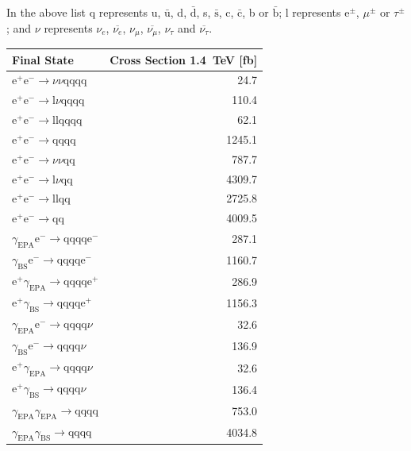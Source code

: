 \noindent In the above list q represents u, $\bar{\text{u}}$, d, $\bar{\text{d}}$, s, $\bar{\text{s}}$, c, $\bar{\text{c}}$, b or $\bar{\text{b}}$;  l represents $\text{e}^{\pm}$, $\mu^{\pm}$ or $\tau^{\pm}$; and $\nu$ represents $\nu_{e}$, $\overline{\nu_{e}}$, $\nu_{\mu}$, $\overline{\nu_{\mu}}$, $\nu_{\tau}$ and $\overline{\nu_{\tau}}$.

\begin{table}[h!]
\centering
\begin{tabular}{ l r }
\hline
Final State & Cross Section 1.4~TeV [fb] \\ 
\hline
$\text{e}^{+}\text{e}^{-} \rightarrow \nu{\nu}\text{qqqq}$ & 24.7 \\
$\text{e}^{+}\text{e}^{-} \rightarrow \text{l}\nu\text{qqqq}$ & 110.4\\
$\text{e}^{+}\text{e}^{-} \rightarrow \text{llqqqq}$ & 62.1\\
$\text{e}^{+}\text{e}^{-} \rightarrow \text{qqqq}$ & 1245.1\\
$\text{e}^{+}\text{e}^{-} \rightarrow \nu{\nu}\text{qq}$ & 787.7\\
$\text{e}^{+}\text{e}^{-} \rightarrow \text{l}\nu\text{qq}$ & 4309.7\\
$\text{e}^{+}\text{e}^{-} \rightarrow \text{llqq}$ & 2725.8\\
$\text{e}^{+}\text{e}^{-} \rightarrow \text{qq}$ & 4009.5\\
$\gamma_{\text{EPA}}\text{e}^{-} \rightarrow \text{qqqq}\text{e}^{-}$ & 287.1\\
$\gamma_{\text{BS}}\text{e}^{-} \rightarrow \text{qqqq}\text{e}^{-}$ & 1160.7\\
$\text{e}^{+}\gamma_{\text{EPA}} \rightarrow \text{qqqq}\text{e}^{+}$ & 286.9\\
$\text{e}^{+}\gamma_{\text{BS}} \rightarrow \text{qqqq}\text{e}^{+}$ & 1156.3\\
$\gamma_{\text{EPA}}\text{e}^{-} \rightarrow \text{qqqq}\nu$ & 32.6\\
$\gamma_{\text{BS}}\text{e}^{-} \rightarrow \text{qqqq}\nu$ & 136.9\\
$\text{e}^{+}\gamma_{\text{EPA}} \rightarrow \text{qqqq}\nu$ & 32.6\\
$\text{e}^{+}\gamma_{\text{BS}} \rightarrow \text{qqqq}\nu$ & 136.4\\
$\gamma_{\text{EPA}}\gamma_{\text{EPA}} \rightarrow \text{qqqq}$ & 753.0\\
$\gamma_{\text{EPA}}\gamma_{\text{BS}} \rightarrow \text{qqqq}$ & 4034.8\\

\end{tabular}
\end{table}
